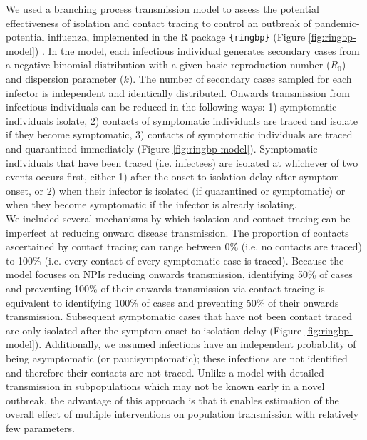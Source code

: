 \documentclass{article}
\begin{document}
We used a branching process transmission model to assess the potential effectiveness of isolation and contact tracing to control an outbreak of pandemic-potential influenza, implemented in the R package \texttt{\{ringbp\}} (Figure \ref{fig:ringbp-model}) \citep{hellewellRingbpSimulateEvaluate2025}. In the model, each infectious individual generates secondary cases from a negative binomial distribution with a given basic reproduction number ($R_0$) and dispersion parameter ($k$). The number of secondary cases sampled for each infector is independent and identically distributed. Onwards transmission from infectious individuals can be reduced in the following ways: 1) symptomatic individuals isolate, 2) contacts of symptomatic individuals are traced and isolate if they become symptomatic, 3) contacts of symptomatic individuals are traced and quarantined immediately (Figure \ref{fig:ringbp-model}). Symptomatic individuals that have been traced (i.e. infectees) are isolated at whichever of two events occurs first, either 1) after the onset-to-isolation delay after symptom onset, or 2) when their infector is isolated (if quarantined or symptomatic) or when they become symptomatic if the infector is already isolating. \\

We included several mechanisms by which isolation and contact tracing can be imperfect at reducing onward disease transmission. The proportion of contacts ascertained by contact tracing can range between 0\% (i.e. no contacts are traced) to 100\% (i.e. every contact of every symptomatic case is traced). Because the model focuses on NPIs reducing onwards transmission, identifying 50\% of cases and preventing 100\% of their onwards transmission via contact tracing is equivalent to identifying 100\% of cases and preventing 50\% of their onwards transmission. Subsequent symptomatic cases that have not been contact traced are only isolated after the symptom onset-to-isolation delay (Figure \ref{fig:ringbp-model}). Additionally, we assumed infections have an independent probability of being asymptomatic (or paucisymptomatic); these infections are not identified and therefore their contacts are not traced. Unlike a model with detailed transmission in subpopulations which may not be known early in a novel outbreak, the advantage of this approach is that it enables estimation of the overall effect of multiple interventions on population transmission with relatively few parameters.
\end{document}
